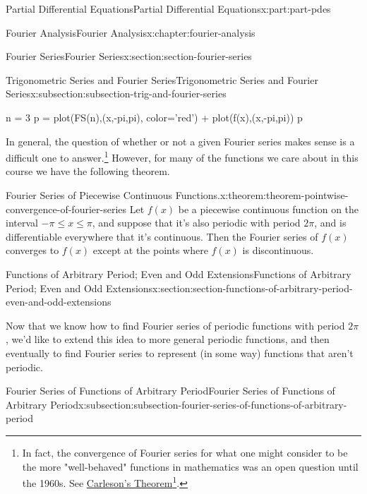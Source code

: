 \documentclass[oneside,10pt,]{book}
\numberwithin{equation}{part}
\begin{document}
\begin{partptx}{Partial Differential Equations}{}{Partial Differential Equations}{}{}{x:part:part-pdes}
\begin{chapterptx}{Fourier Analysis}{}{Fourier Analysis}{}{}{x:chapter:fourier-analysis}
\begin{sectionptx}{Fourier Series}{}{Fourier Series}{}{}{x:section:section-fourier-series}
\begin{subsectionptx}{Trigonometric Series and Fourier Series}{}{Trigonometric Series and Fourier Series}{}{}{x:subsection:subsection-trig-and-fourier-series}
\begin{sageinput}
n = 3
p = plot(FS(n),(x,-pi,pi), color='red') + plot(f(x),(x,-pi,pi))
p
\end{sageinput}
In general, the question of whether or not a given Fourier series makes sense is a difficult one to answer.\footnote{In fact, the convergence of Fourier series for what one might consider to be the more "well-behaved" functions in mathematics was an open question until the 1960s. See \href{https://en.wikipedia.org/wiki/Carleson\%27s_theorem}{Carleson's Theorem}\footnote{\nolinkurl{https://en.wikipedia.org/wiki/Carleson\%27s_theorem}\label{g:fn:idp105548780678560}}.\label{x:fn:footnote-convergence-of-fourier-series}} However, for many of the functions we care about in this course we have the following theorem.%
\begin{theorem}{Fourier Series of Piecewise Continuous Functions.}{}{x:theorem:theorem-pointwise-convergence-of-fourier-series}%
%
Let \(f(x)\) be a piecewise continuous function on the interval \(-\pi\leq x\leq\pi\), and suppose that it's also periodic with period \(2\pi\), and is differentiable everywhere that it's continuous. Then the Fourier series of \(f(x)\) converges to \(f(x)\) except at the points where \(f(x)\) is discontinuous.%
\end{theorem}
\end{subsectionptx}
\end{sectionptx}
%
%
\typeout{************************************************}
\typeout{************************************************}
%
\begin{sectionptx}{Functions of Arbitrary Period; Even and Odd Extensions}{}{Functions of Arbitrary Period; Even and Odd Extensions}{}{}{x:section:section-functions-of-arbitrary-period-even-and-odd-extensions}
\begin{introduction}{}%
Now that we know how to find Fourier series of periodic functions with period \(2\pi\), we'd like to extend this idea to more general periodic functions, and then eventually to find Fourier series to represent (in some way) functions that aren't periodic.%
\end{introduction}%
%
%
\typeout{************************************************}
\typeout{************************************************}
%
\begin{subsectionptx}{Fourier Series of Functions of Arbitrary Period}{}{Fourier Series of Functions of Arbitrary Period}{}{}{x:subsection:subsection-fourier-series-of-functions-of-arbitrary-period}

\end{subsectionptx}
\end{sectionptx}
\end{chapterptx}
\end{partptx}
\end{document}
